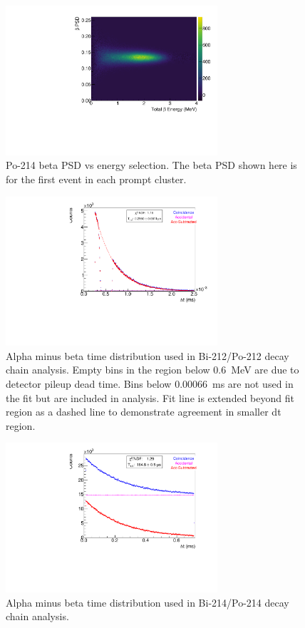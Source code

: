 \begin{figure}[!b]
\centering
\includegraphics[width=0.7\textwidth]{figures/BiPo214BetaPSDvsE.pdf}
\caption{\label{fig:bpsd214}Po-214 beta PSD vs energy selection. The beta PSD shown here is for the first event in each prompt cluster.}
\end{figure}
\begin{figure}[!b]
\centering
\includegraphics[width=0.7\textwidth]{figures/BiPo212DeltaTSpectrum.pdf}
\caption{\label{fig:dt212}Alpha minus beta time distribution used in Bi-212/Po-212 decay chain analysis. Empty bins in the region below 0.6~MeV are due to detector pileup dead time. Bins below 0.00066~ms are not used in the fit but are included in analysis. Fit line is extended beyond fit region as a dashed line to demonstrate agreement in smaller dt region. }
\end{figure}

\begin{figure}[!bp]
\centering
\includegraphics[width=0.7\textwidth]{figures/BiPo214DeltaTSpectrum.pdf}
\caption{\label{fig:dt214}Alpha minus beta time distribution used in Bi-214/Po-214 decay chain analysis.}
\end{figure}
\clearpage
\newpage

